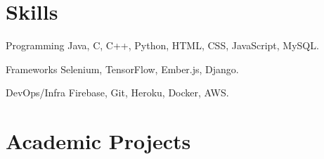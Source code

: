 \documentclass{tccv}
\begin{document}
\section{Skills}

\begin{factlist}

\item{Programming}
     {Java, C, C++, Python, HTML, CSS, JavaScript, MySQL.}

\item{Frameworks}
     {Selenium, TensorFlow, Ember.js, Django.}

\item{DevOps/Infra}
     {Firebase, Git, Heroku, Docker, AWS.}

\end{factlist}

\bigskip
\bigskip
\bigskip
\bigskip
\bigskip
\bigskip
\bigskip
\bigskip
\bigskip
\bigskip

\section{Academic Projects}
\end{document}

